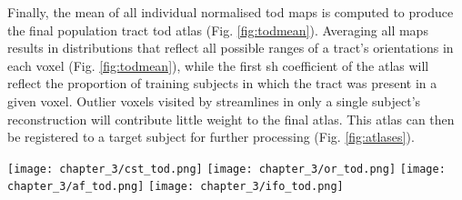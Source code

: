 Finally, the mean of all individual normalised \gls{tod} maps is computed to produce the final population tract \gls{tod} atlas (Fig. \ref{fig:todmean}).
Averaging all maps results in distributions that reflect all possible ranges of a tract's orientations in each voxel (Fig. \ref{fig:todmean}), while the first \gls{sh} coefficient of the atlas will reflect the proportion of training subjects in which the tract was present in a given voxel.
Outlier voxels visited by streamlines in only a single subject's reconstruction will contribute little weight to the final atlas.
This atlas can then be registered to a target subject for further processing (Fig. \ref{fig:atlases}).

%

\begin{figure*}[htb!]
  \centering
    \texttt{[image: chapter\_3/cst\_tod.png]}%
    \texttt{[image: chapter\_3/or\_tod.png]}
    \texttt{[image: chapter\_3/af\_tod.png]}%
    \texttt{[image: chapter\_3/ifo\_tod.png]}
  \caption[Tract orientation atlases for the CST, AF, OR and IFOF]{Tract orientation atlases, composite images projected onto coronal (CST), axial (OR, IFOF) and sagittal (AF) views in MNI152 reference space. Reproduced from \textcite{Young2024}}\label{fig:atlases}
\end{figure*}
